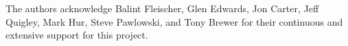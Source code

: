The authors acknowledge Balint Fleischer, Glen Edwards, Jon Carter, Jeff Quigley, Mark Hur, Steve Pawlowski, and Tony Brewer for their continuous and extensive support for this project.